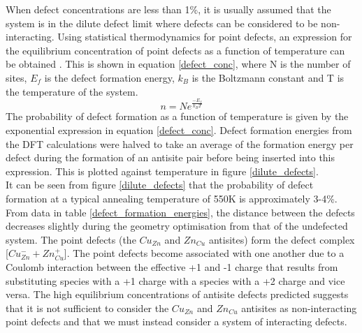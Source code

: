 When defect concentrations are less than 1\%, it is usually assumed that the system is in the dilute defect limit where defects can be considered to be non-interacting. Using statistical thermodynamics for point defects, an expression for the equilibrium concentration of point defects as a function of temperature can be obtained \cite{thermodynamics}. This is shown in equation \ref{defect_conc}, where N is the number of sites, $E_f$ is the defect formation energy, $k_B$ is the Boltzmann constant and T is the temperature of the system.
\begin{equation} \label{defect_conc}
n = Ne^{\frac{-E_f}{k_BT}}
\end{equation}
The probability of defect formation as a function of temperature is given by the exponential expression in equation \ref{defect_conc}. Defect formation energies from the DFT calculations were halved to take an average of the formation energy per defect during the formation of an antisite pair before being inserted into this expression. This is plotted against temperature in figure \ref{dilute_defects}. \\

It can be seen from figure \ref{dilute_defects} that the probability of defect formation at a typical annealing temperature of 550K \cite{anneal_temp} is approximately 3-4\%.
From data in table \ref{defect_formation_energies}, the distance between the defects decreases slightly during the geometry optimisation from that of the undefected system.
The point defects (the $Cu_{Zn}$ and $Zn_{Cu}$ antisites) form the defect complex [$Cu_{Zn}^- + Zn_{Cu}^+$]. The point defects become associated with one another due to a Coulomb interaction between the effective +1 and -1 charge that results from substituting species with a +1 charge with a species with a +2 charge and vice versa. The high equilibrium concentrations of antisite defects predicted suggests that it is not sufficient to consider the $Cu_{Zn}$ and $Zn_{Cu}$ antisites as non-interacting point defects and that we must instead consider a system of interacting defects.


